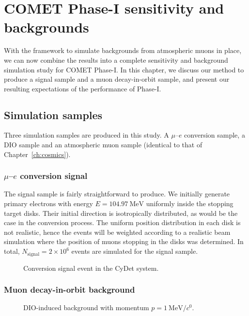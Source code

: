 \chapter{COMET Phase-I sensitivity and backgrounds}

With the framework to simulate backgrounds from atmospheric muons in place, we
can now combine the results into a complete sensitivity and background
simulation study for COMET Phase-I. In this chapter, we discuss our method to
produce a signal sample and a muon decay-in-orbit sample, and present our
resulting expectations of the performance of Phase-I.

\section{Simulation samples}
Three simulation samples are produced in this study. A $\mu$--$e$ conversion
sample, a DIO sample and an atmospheric muon sample (identical to that of
Chapter~\ref{ch:cosmics}). 

\subsection{$\mu$--$e$ conversion signal}
The signal sample is fairly straightforward to produce. We initially generate
primary electrons with energy $E=\SI{104.97}{\MeV}$ uniformly inside the
stopping target disks. Their initial direction is isotropically distributed, as
would be the case in the conversion process. The uniform position distribution
in each disk is not realistic, hence the events will be weighted according to a
realistic beam simulation where the position of muons stopping in the disks was
determined. In total, $N_\mathrm{signal} = 2\times 10^6$ events are simulated
for the signal sample.


\begin{figure}
    \centering
    
    \caption{Conversion signal event in the CyDet system.}
    \label{fig:signal_in_cydet}
\end{figure}


\subsection{Muon decay-in-orbit background}
\begin{figure}
    \centering
    
    \caption{DIO-induced background with momentum  $p=\SI{1}{\MeV/\clight}$.}
    \label{fig:muon_dio_in_cydet}
\end{figure}

